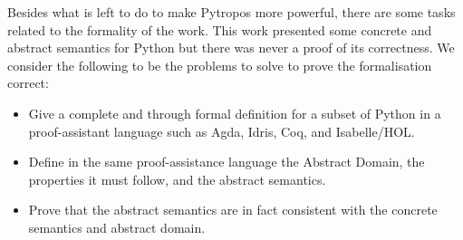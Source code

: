 Besides what is left to do to make Pytropos more powerful, there are some tasks related to
the formality of the work. This work presented some concrete and abstract semantics for
Python but there was never a proof of its correctness. We consider the following to be the
problems to solve to prove the formalisation correct:

\begin{itemize}
\tightlist
\item Give a complete and through formal definition for a subset of Python in a
  proof-assistant language such as Agda, Idris, Coq, and Isabelle/HOL.
\item Define in the same proof-assistance language the Abstract Domain, the properties it
  must follow, and the abstract semantics.
\item Prove that the abstract semantics are in fact consistent with the concrete semantics
  and abstract domain.
\end{itemize}


